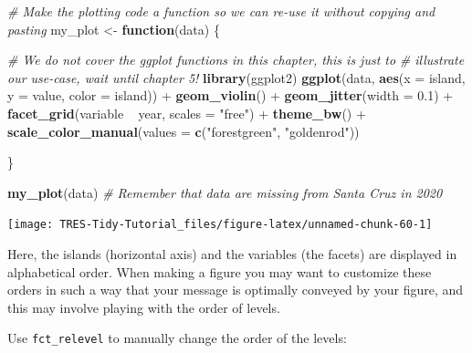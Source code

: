 \documentclass[]{book}
\newenvironment{Shaded}{}{}
\newcommand{\CommentTok}[1]{\textcolor[rgb]{0.38,0.63,0.69}{\textit{#1}}}
\newcommand{\ControlFlowTok}[1]{\textcolor[rgb]{0.00,0.44,0.13}{\textbf{#1}}}
\newcommand{\DataTypeTok}[1]{\textcolor[rgb]{0.56,0.13,0.00}{#1}}
\newcommand{\FloatTok}[1]{\textcolor[rgb]{0.25,0.63,0.44}{#1}}
\newcommand{\KeywordTok}[1]{\textcolor[rgb]{0.00,0.44,0.13}{\textbf{#1}}}
\newcommand{\NormalTok}[1]{#1}
\newcommand{\OperatorTok}[1]{\textcolor[rgb]{0.40,0.40,0.40}{#1}}
\newcommand{\StringTok}[1]{\textcolor[rgb]{0.25,0.44,0.63}{#1}}
\begin{document}
\begin{Shaded}
\begin{Highlighting}[]
\CommentTok{# Make the plotting code a function so we can re-use it without copying and pasting}
\NormalTok{my_plot <-}\StringTok{ }\ControlFlowTok{function}\NormalTok{(data) \{}
  
  \CommentTok{# We do not cover the ggplot functions in this chapter, this is just to}
  \CommentTok{# illustrate our use-case, wait until chapter 5!}
  \KeywordTok{library}\NormalTok{(ggplot2)}
  \KeywordTok{ggplot}\NormalTok{(data, }\KeywordTok{aes}\NormalTok{(}\DataTypeTok{x =}\NormalTok{ island, }\DataTypeTok{y =}\NormalTok{ value, }\DataTypeTok{color =}\NormalTok{ island)) }\OperatorTok{+}\StringTok{ }
\StringTok{    }\KeywordTok{geom_violin}\NormalTok{() }\OperatorTok{+}\StringTok{ }
\StringTok{    }\KeywordTok{geom_jitter}\NormalTok{(}\DataTypeTok{width =} \FloatTok{0.1}\NormalTok{) }\OperatorTok{+}
\StringTok{    }\KeywordTok{facet_grid}\NormalTok{(variable }\OperatorTok{~}\StringTok{ }\NormalTok{year, }\DataTypeTok{scales =} \StringTok{"free"}\NormalTok{) }\OperatorTok{+}
\StringTok{    }\KeywordTok{theme_bw}\NormalTok{() }\OperatorTok{+}
\StringTok{    }\KeywordTok{scale_color_manual}\NormalTok{(}\DataTypeTok{values =} \KeywordTok{c}\NormalTok{(}\StringTok{"forestgreen"}\NormalTok{, }\StringTok{"goldenrod"}\NormalTok{))}
  
\NormalTok{\}}

\KeywordTok{my_plot}\NormalTok{(data)}
\CommentTok{# Remember that data are missing from Santa Cruz in 2020}
\end{Highlighting}
\end{Shaded}

\begin{center}\texttt{[image: TRES-Tidy-Tutorial\_files/figure-latex/unnamed-chunk-60-1]} \end{center}

Here, the islands (horizontal axis) and the variables (the facets) are displayed in alphabetical order. When making a figure you may want to customize these orders in such a way that your message is optimally conveyed by your figure, and this may involve playing with the order of levels.

Use \texttt{fct\_relevel} to manually change the order of the levels:

\begin{Shaded}
\end{Shaded}
\end{document}
